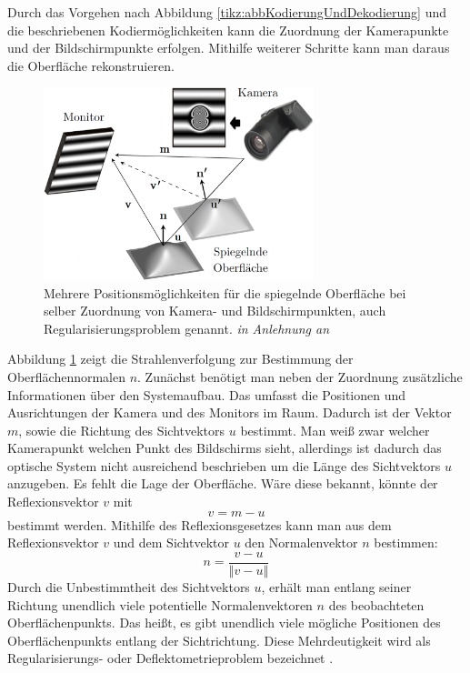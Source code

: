 Durch das Vorgehen nach Abbildung \ref{tikz:abbKodierungUndDekodierung} und die beschriebenen Kodiermöglichkeiten kann die Zuordnung der Kamerapunkte und der Bildschirmpunkte erfolgen.
Mithilfe weiterer Schritte kann man daraus die Oberfläche rekonstruieren.
%
\begin{figure}[H]
	\centering
	\includegraphics[width=0.7\textwidth]{02_grundlagenZurDeflektometrie/rekonstruktion/rekonstruktionUndRegularisierungsproblem/figures/regularisierungsproblem}
	\caption[Regularisierungsproblem]{Mehrere Positionsmöglichkeiten für die spiegelnde Oberfläche bei selber Zuordnung von Kamera- und Bildschirmpunkten, auch Regularisierungsproblem genannt. \textit{in Anlehnung an} \cite{stereoDeflektometrie}}
	\label{img:regularisierungsproblem}
\end{figure}
%
\noindent
Abbildung \ref{img:regularisierungsproblem} zeigt die Strahlenverfolgung zur Bestimmung der Oberflächennormalen $n$.
Zunächst benötigt man neben der Zuordnung zusätzliche Informationen über den Systemaufbau.
Das umfasst die Positionen und Ausrichtungen der Kamera und des Monitors im Raum.
Dadurch ist der Vektor $m$, sowie die Richtung des Sichtvektors $u$ bestimmt.
Man weiß zwar welcher Kamerapunkt welchen Punkt des Bildschirms sieht, allerdings ist dadurch das optische System nicht ausreichend beschrieben um die Länge des Sichtvektors $u$ anzugeben.
Es fehlt die Lage der Oberfläche.
Wäre diese bekannt, könnte der Reflexionsvektor $v$ mit 
\begin{equation*}
	v = m - u
\end{equation*}
bestimmt werden.
Mithilfe des Reflexionsgesetzes kann man aus dem Reflexionsvektor $v$ und dem Sichtvektor $u$ den Normalenvektor $n$ bestimmen:
%
\begin{equation}
	n = \dfrac{v - u}{\left\Vert v - u \right\Vert}	
\end{equation}
%
Durch die Unbestimmtheit des Sichtvektors $u$, erhält man entlang seiner Richtung unendlich viele potentielle Normalenvektoren $n$ des beobachteten Oberflächenpunkts.
Das heißt, es gibt unendlich viele mögliche Positionen des Oberflächenpunkts entlang der Sichtrichtung.
Diese Mehrdeutigkeit wird als Regularisierungs- oder Deflektometrieproblem bezeichnet \cite{regularisierungsproblem}.

